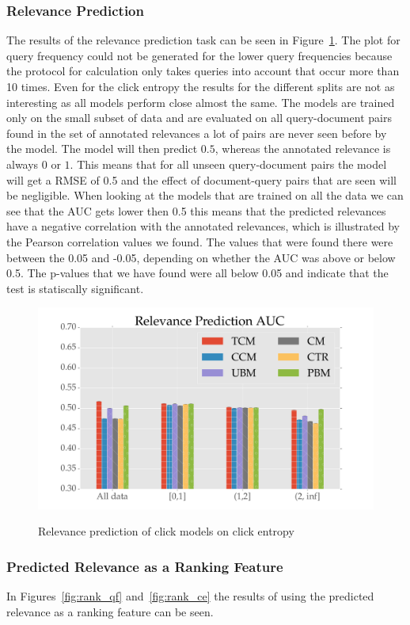 \subsubsection{Relevance Prediction}
The results of the relevance prediction task can be seen in Figure~\ref{fig:rel_ce}. The plot for query frequency could not be generated for the lower query frequencies because the protocol for calculation only takes queries into account that occur more than 10 times. Even for the click entropy the results for the different splits are not as interesting as all models perform close almost the same. The models are trained only on the small subset of data and are evaluated on all query-document pairs found in the set of annotated relevances a lot of pairs are never seen before by the model. The model will then predict $0.5$, whereas the annotated relevance is always $0$ or $1$. This means that for all unseen query-document pairs the model will get a RMSE of 0.5 and the effect of document-query pairs that are seen will be negligible. When looking at the models that are trained on all the data we can see that the AUC gets lower then 0.5 this means that the predicted relevances have a negative correlation with the annotated relevances, which is illustrated by the Pearson correlation values we found. The values that were found there were between the 0.05 and -0.05, depending on whether the AUC was above or below 0.5. The p-values that we have found were all below 0.05 and indicate that the test is statiscally significant.

\begin{figure}
	\centering
	\includegraphics[width=.49\textwidth]{figures/Rel_Pred_AUC_ce.pdf}
	\label{fig:rel_ce}
	\caption{Relevance prediction of click models on click entropy}
\end{figure}

\subsubsection{Predicted Relevance as a Ranking Feature}
In Figures~\ref{fig:rank_qf} and~\ref{fig:rank_ce} the results of using the predicted relevance as a ranking feature can be seen.

